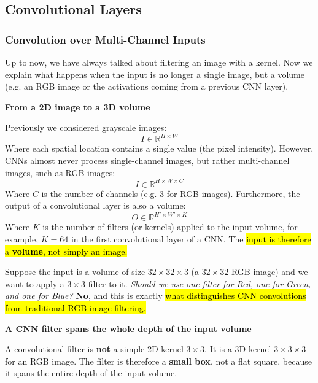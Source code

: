 \subsection{Convolutional Layers}\label{sec:convolutional-layers}

\subsubsection{Convolution over Multi-Channel Inputs}\label{sec:convolution-over-multi-channel-inputs}

Up to now, we have always talked about filtering an image with a kernel. Now we explain what happens when the input is no longer a single image, but a volume (e.g. an RGB image or the activations coming from a previous CNN layer).

\highspace
\begin{flushleft}
    \textcolor{Green3}{ \textbf{From a 2D image to a 3D volume}}
\end{flushleft}
Previously we considered grayscale images:
\begin{equation*}
    I \in \mathbb{R}^{H \times W}
\end{equation*}
Where each spatial location contains a single value (the pixel intensity). However, CNNs almost never process single-channel images, but rather multi-channel images, such as RGB images:
\begin{equation*}
    I \in \mathbb{R}^{H \times W \times C}
\end{equation*}
Where $C$ is the number of channels (e.g. 3 for RGB images). Furthermore, the output of a convolutional layer is also a volume:
\begin{equation*}
    O \in \mathbb{R}^{H' \times W' \times K}
\end{equation*}
Where $K$ is the number of filters (or kernels) applied to the input volume, for example, $K=64$ in the first convolutional layer of a CNN. The \hl{input is therefore a \textbf{volume}, not simply an image.}

\highspace
\textcolor{Green3}{} Suppose the input is a volume of size $32 \times 32 \times 3$ (a $32 \times 32$ RGB image) and we want to apply a $3 \times 3$ filter to it. \emph{Should we use one filter for Red, one for Green, and one for Blue?} \textbf{No}, and this is exactly \hl{what distinguishes CNN convolutions from traditional RGB image filtering.}

\highspace
\begin{flushleft}
    \textcolor{Green3}{ \textbf{A CNN filter spans the whole depth of the input volume}}
\end{flushleft}
A convolutional filter is \textbf{not} a simple 2D kernel $3 \times 3$. It is a 3D kernel $3 \times 3 \times 3$ for an RGB image. The filter is therefore a \textbf{small box}, not a flat square, because it spans the entire depth of the input volume.

